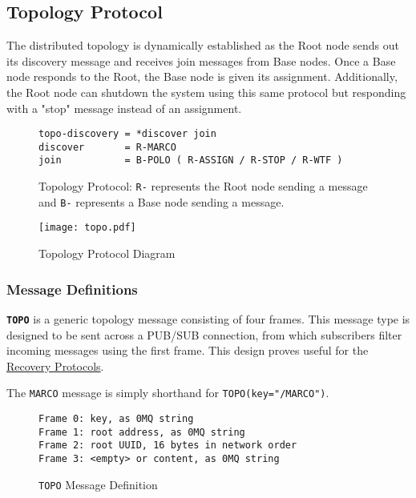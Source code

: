 \subsection{Topology Protocol}
\label{proto_topo}

The \dcamp distributed topology is dynamically established as the Root node sends out its discovery message and receives
join messages from Base nodes. Once a Base node responds to the Root, the Base node is given its assignment.
Additionally, the Root node can shutdown the system using this same protocol but responding with a "stop" message
instead of an assignment.

\begin{figure}[H]
\vspace{+10pt}
\begin{verbatim}
topo-discovery = *discover join
discover       = R-MARCO
join           = B-POLO ( R-ASSIGN / R-STOP / R-WTF )
\end{verbatim}
\vspace{-5pt}
\caption[Topology Protocol]
        {Topology Protocol: \texttt{R-} represents the Root node sending a message and \texttt{B-}
         represents a Base node sending a message.}
\label{fig:proto_topo_spec}
\end{figure}

\begin{figure}[H]
    \centering
    \texttt{[image: topo.pdf]}
    \label{fig:proto_topo_image}
    \caption{Topology Protocol Diagram}
\end{figure}

\subsubsection{Message Definitions}

\textbf{\texttt{TOPO}} is a generic topology message consisting of four frames. This message type is designed to be sent
across a PUB/SUB connection, from which subscribers filter incoming messages using the first frame. This design proves
useful for the \hyperref[proto_reco]{Recovery Protocols}.

The \texttt{MARCO} message is simply shorthand for \texttt{TOPO(key="/MARCO")}.

\begin{figure}[H]
\vspace{+10pt}
\begin{verbatim}
Frame 0: key, as 0MQ string
Frame 1: root address, as 0MQ string
Frame 2: root UUID, 16 bytes in network order
Frame 3: <empty> or content, as 0MQ string
\end{verbatim}
\vspace{-20pt}
\caption{\texttt{TOPO} Message Definition}
\label{fig:message_topo}
\end{figure}

